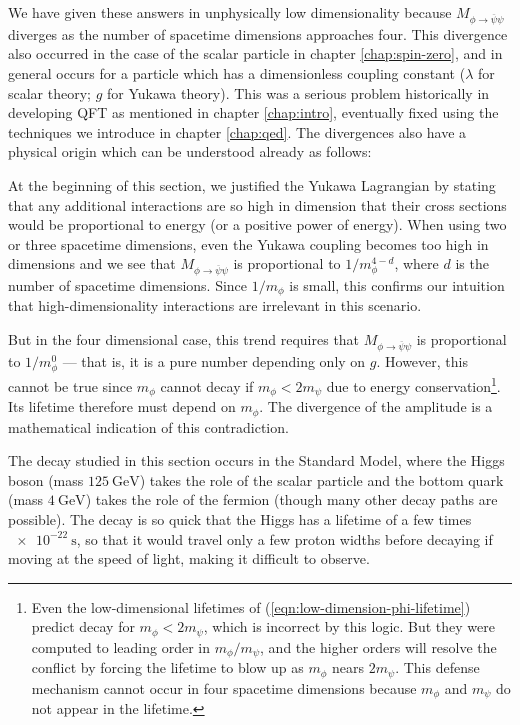 We have given these answers in unphysically low dimensionality because $M_{\phi \rightarrow \overline \psi \psi}$ diverges as the number of spacetime dimensions approaches four. This divergence also occurred in the case of the scalar particle in chapter \ref{chap:spin-zero}, and in general occurs for a particle which has a dimensionless coupling constant ($\lambda$ for scalar theory; $g$ for Yukawa theory). This was a serious problem historically in developing QFT as mentioned in chapter \ref{chap:intro}, eventually fixed using the techniques we introduce in chapter \ref{chap:qed}. The divergences also have a physical origin which can be understood already as follows:

At the beginning of this section, we justified the Yukawa Lagrangian by stating that any additional interactions are so high in dimension that their cross sections would be proportional to energy (or a positive power of energy). When using two or three spacetime dimensions, even the Yukawa coupling becomes too high in dimensions and we see that $M_{\phi \rightarrow \overline \psi \psi}$ is proportional to $1/m_\phi^{4-d}$, where $d$ is the number of spacetime dimensions. Since $1/m_\phi$ is small, this confirms our intuition that high-dimensionality interactions are irrelevant in this scenario.

But in the four dimensional case, this trend requires that $M_{\phi \rightarrow \overline \psi \psi}$ is proportional to $1/m_\phi^0$ --- that is, it is a pure number depending only on $g$. However, this cannot be true since $m_\phi$ cannot decay if $m_\phi < 2m_\psi$ due to energy conservation\footnote{Even the low-dimensional lifetimes of (\ref{eqn:low-dimension-phi-lifetime}) predict decay for $m_\phi < 2m_\psi$, which is incorrect by this logic. But they were computed to leading order in $m_\phi/m_\psi$, and the higher orders will resolve the conflict by forcing the lifetime to blow up as $m_\phi$ nears $2m_\psi$. This defense mechanism cannot occur in four spacetime dimensions because $m_\phi$ and $m_\psi$ do not appear in the lifetime.}. Its lifetime therefore must depend on $m_\phi$. The divergence of the amplitude is a mathematical indication of this contradiction.

The decay studied in this section occurs in the Standard Model, where the Higgs boson (mass $\SI{125}{\giga \electronvolt}$) takes the role of the scalar particle and the bottom quark (mass $\SI{4}{\giga \electronvolt}$) takes the role of the fermion (though many other decay paths are possible). The decay is so quick that the Higgs has a lifetime of a few times $\SI{e-22}{\second}$, so that it would travel only a few proton widths before decaying if moving at the speed of light, making it difficult to observe.

